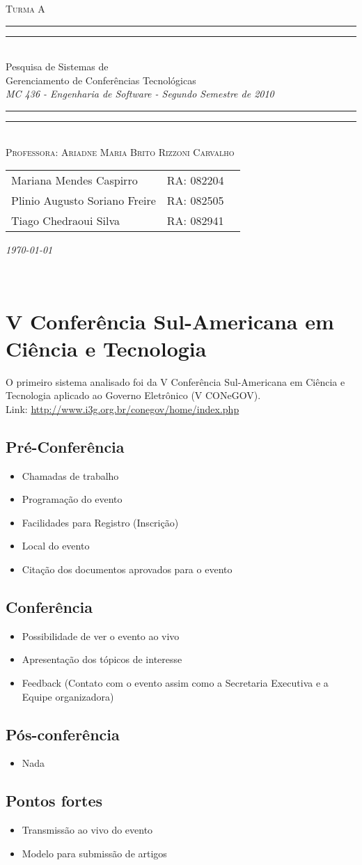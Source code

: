 \documentclass[letter]{article}
\newcommand*{\titleTMB}{\begingroup \centering \settowidth{\unitlength}{\LARGE MC 613} \vspace*{\baselineskip} {\large\scshape  Turma A}\\[\baselineskip] \rule{11.0cm}{1.6pt}\vspace*{-\baselineskip}\vspace*{2pt} \rule{11.0cm}{0.4pt}\\[\baselineskip] {\LARGE  Pesquisa de Sistemas de  }\\[0.2\baselineskip] {\LARGE  Gerenciamento de Conferências Tecnológicas }\\[0.2\baselineskip] {\itshape MC 436 - Engenharia de Software - Segundo Semestre de 2010}\\[0.2\baselineskip] \rule{11.0cm}{0.4pt}\vspace*{-\baselineskip}\vspace{3.2pt} \rule{11.0cm}{1.6pt}\\[\baselineskip] {\large\scshape Professora: Ariadne Maria Brito Rizzoni Carvalho}\par \vfill {\normalsize   \scshape 
    \begin{center} 
      \begin{tabular}{  l  l  p{5cm} } 
        Mariana Mendes Caspirro & RA: 082204\\
        Plinio Augusto Soriano Freire & RA:  082505\\
        Tiago Chedraoui Silva  & RA: 082941\\
      \end{tabular} \end{center}
    \itshape \today }\\[\baselineskip] \vspace{3.2pt} \endgroup}
\begin{document}
\titleTMB 
\newpage
\section{ V Conferência Sul-Americana em Ciência e Tecnologia}
O primeiro sistema analisado foi da V Conferência Sul-Americana em Ciência e Tecnologia aplicado ao Governo Eletrônico (V CONeGOV).\\ Link: \url{http://www.i3g.org.br/conegov/home/index.php}

\subsection{Pré-Conferência}

\begin{itemize}
\item Chamadas de trabalho
\item Programação do evento
\item Facilidades para Registro (Inscrição)
\item Local do evento
\item Citação dos documentos aprovados para o evento             
\end{itemize}

\subsection{Conferência}
\begin{itemize}
\item Possibilidade de ver o evento ao vivo

\item Apresentação dos tópicos de interesse

\item Feedback (Contato com o evento assim como a Secretaria Executiva e a Equipe organizadora)

\end{itemize}

\subsection{Pós-conferência}
\begin{itemize}
\item Nada
\end{itemize}


\subsection{Pontos fortes}
\begin{itemize}
\item Transmissão ao vivo do evento

\item Modelo para submissão de artigos

  
\end{itemize}
\end{document}
